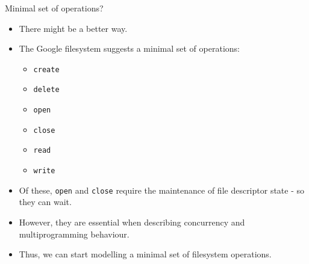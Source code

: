 \documentclass{beamer}
\begin{document}

\begin{frame}{Minimal set of operations?}
  \begin{itemize}
  \item There might be a better way.
  \item The Google filesystem suggests a minimal set of operations:
    \begin{itemize}
    \item \texttt{create}
    \item \texttt{delete}
    \item \texttt{open}
    \item \texttt{close}
    \item \texttt{read}
    \item \texttt{write}
    \end{itemize}
  \item Of these, \texttt{open} and \texttt{close} require the
    maintenance of file descriptor state - so they can wait.
  \item However, they are essential when describing concurrency and
    multiprogramming behaviour.
  \item Thus, we can start modelling a minimal set of filesystem
    operations.
  \end{itemize}
\end{frame}
\end{document}
